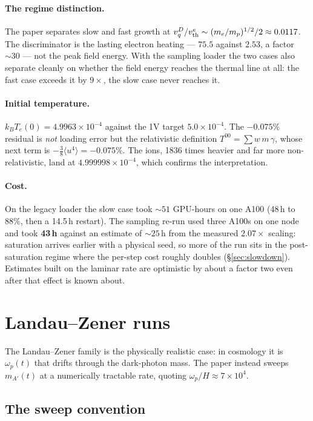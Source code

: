 \documentclass[11pt,a4paper]{article}
\newcommand{\vth}{v_{\rm th}^{e}}
\begin{document}
\paragraph{The regime distinction.} The paper separates slow and fast growth at
$v_q^D/\vth \sim (m_e/m_p)^{1/2}/2 \approx 0.0117$. The discriminator is the lasting
electron heating --- $75.5$ against $2.53$, a factor ${\sim}30$ --- not the peak field
energy. With the sampling loader the two cases also separate cleanly on whether the
field energy reaches the thermal line at all: the fast case exceeds it by $9\times$,
the slow case never reaches it.

\paragraph{Initial temperature.} $k_BT_e(0) = 4.9963\times10^{-4}$ against the 1V
target $5.0\times10^{-4}$. The $-0.075\%$ residual is \emph{not} loading error but the
relativistic definition $T^{00} = \sum w\,m\,\gamma$, whose next term is
$-\tfrac38\langle u^4\rangle = -0.075\%$. The ions, 1836 times heavier and far more
non-relativistic, land at $4.999998\times10^{-4}$, which confirms the interpretation.

\paragraph{Cost.} On the legacy loader the slow case took ${\sim}51$ GPU-hours on one
A100 (48\,h to 88\%, then a 14.5\,h restart). The sampling re-run used three A100s on
one node and took \textbf{43\,h} against an estimate of ${\sim}25$\,h from the measured
$2.07\times$ scaling: saturation arrives earlier with a physical seed, so more of the
run sits in the post-saturation regime where the per-step cost roughly doubles
(\S\ref{sec:slowdown}). Estimates built on the laminar rate are optimistic by about a
factor two even after that effect is known about.

\section{Landau--Zener runs}
\label{sec:lz}

The Landau--Zener family is the physically realistic case: in cosmology it is
$\omega_p(t)$ that drifts through the dark-photon mass. The paper instead sweeps
$m_{A'}(t)$ at a numerically tractable rate, quoting
$\omega_p/H \approx 7\times10^4$.

\subsection{The sweep convention}
\label{sec:sweep}
\end{document}
